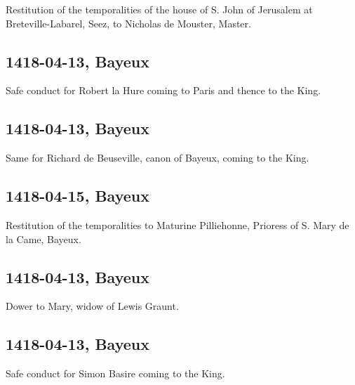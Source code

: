 \documentclass[a4paper,12pt,twoside]{book}
\begin{document}
                
                     Restitution of the temporalities of the house of S. John of Jerusalem at Breteville-Labarel, Seez, to Nicholas de Mouster, Master.
                  
                
                \subsection{1418-04-13, Bayeux}
                
                
                     Safe conduct for Robert la Hure coming to Paris and thence to the King.
                  
                
                \subsection{1418-04-13, Bayeux}
                
                
                     Same for Richard de Beuseville, canon of Bayeux, coming to the King.
                  
                
                \subsection{1418-04-15, Bayeux}
                
                
                     Restitution of the temporalities to Maturine Pilliehonne, Prioress of S. Mary de la Came, Bayeux.
                  
                
                \subsection{1418-04-13, Bayeux}
                
                
                     Dower to Mary, widow of Lewis Graunt.
                  
                
                \subsection{1418-04-13, Bayeux}
                
                
                     Safe conduct for Simon Basire coming to the King.
                  
\end{document}
